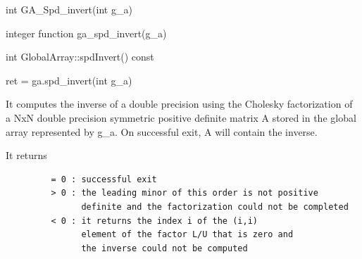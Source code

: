 \documentclass[10pt]{article}
\begin{document}

\begin{capi}
\begin{ccode}
int GA_Spd_invert(int g_a)
\end{ccode}
\begin{funcargs}
\end{funcargs}
\end{capi}

\begin{fapi}
\begin{fcode}
integer function ga_spd_invert(g_a)
\end{fcode}
\begin{funcargs}
\end{funcargs}
\end{fapi}

\begin{cxxapi}
\begin{cxxcode}
int GlobalArray::spdInvert() const
\end{cxxcode}
\begin{funcargs}
\end{funcargs}
\end{cxxapi}

\begin{pyapi}
\begin{pycode}
ret = ga.spd_invert(int g_a)
\end{pycode}
\begin{funcargs}
\end{funcargs}
\end{pyapi}

\gcoll

\begin{desc}

It computes the inverse of a double precision using the Cholesky factorization
of a NxN double precision symmetric positive definite matrix A stored in the
global array represented by g_a. On successful exit, A will contain the
inverse.

It returns
\begin{verbatim}
         = 0 : successful exit
         > 0 : the leading minor of this order is not positive
               definite and the factorization could not be completed
         < 0 : it returns the index i of the (i,i)
               element of the factor L/U that is zero and
               the inverse could not be computed
\end{verbatim}

\end{desc}
\end{document}
